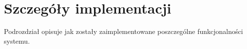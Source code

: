 \section{Szczegóły implementacji}
Podrozdział opisuje jak zostały zaimplementowane poszczególne funkcjonalności systemu.